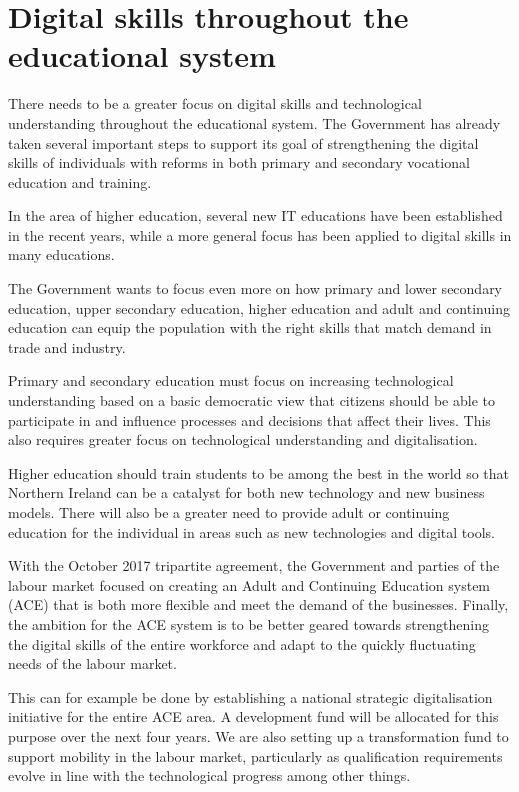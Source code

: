 \section{Digital skills throughout the educational system}

There needs to be a greater focus on digital skills and technological understanding throughout the educational system. The Government has already taken several important steps to support its goal of strengthening the digital skills of individuals with reforms in both primary and secondary vocational education and training.

In the area of higher education, several new IT educations have been established in the recent years, while a more general focus has been applied to digital skills in many educations.

The Government wants to focus even more on how primary and lower secondary education, upper secondary education, higher education and adult and continuing education can equip the population with the right skills that match demand in trade and industry.

Primary and secondary education must focus on increasing technological understanding based on a basic democratic view that citizens should be able to participate in and influence processes and decisions that affect their lives. This also requires greater focus on technological understanding and digitalisation.

Higher education should train students to be among the best in the world so that Northern Ireland can be a catalyst for both new technology and new business models. There will also be a greater need to provide adult or continuing education for the individual in areas such as new technologies and digital tools.

With the October 2017 tripartite agreement, the Government and parties of the labour market focused on creating an Adult and Continuing Education system (ACE) that is both more flexible and meet the demand of the businesses. Finally, the ambition for the ACE system is to be better geared towards strengthening the digital skills of the entire workforce and adapt to the quickly fluctuating needs of the labour market.

This can for example be done by establishing a national strategic digitalisation initiative for the entire ACE area. A development fund will be allocated for this purpose over the next four years. We are also setting up a transformation fund to support mobility in the labour market, particularly as qualification requirements evolve in line with the technological progress among other things.

